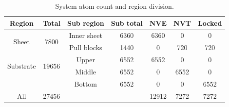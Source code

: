 \begin{table}[H]
  \begin{center}
  \caption{System atom count and region division.}
  \label{tab:system_count}
  \begin{tabular}{ |c|| c | c | c | c | c | c |} \hline
    \textbf{Region} & \textbf{Total}  & Sub region & Sub total & \textbf{NVE} & \textbf{NVT} & \textbf{Locked} \\ \hline   
    \multirow{2}{*}{Sheet} & \multirow{2}{*}{7800} & Inner sheet & 6360 & 6360 & 0 & 0 \\ %
    & & Pull blocks & 1440 & 0 & 720 & 720 \\ \hline   
    \multirow{2}{*}{Substrate} & \multirow{2}{*}{19656} & Upper & 6552 & 6552 & 0 & 0 \\ %
    & & Middle & 6552 & 0 & 6552 & 0 \\ %
    & & Bottom & 6552 & 0 & 0 & 6552 \\ \hline \hline   
    All & 27456 & \multicolumn{2}{r|}{} & 12912 & 7272 & 7272 \\ \hline 
  \end{tabular}
  \end{center}
\end{table}





